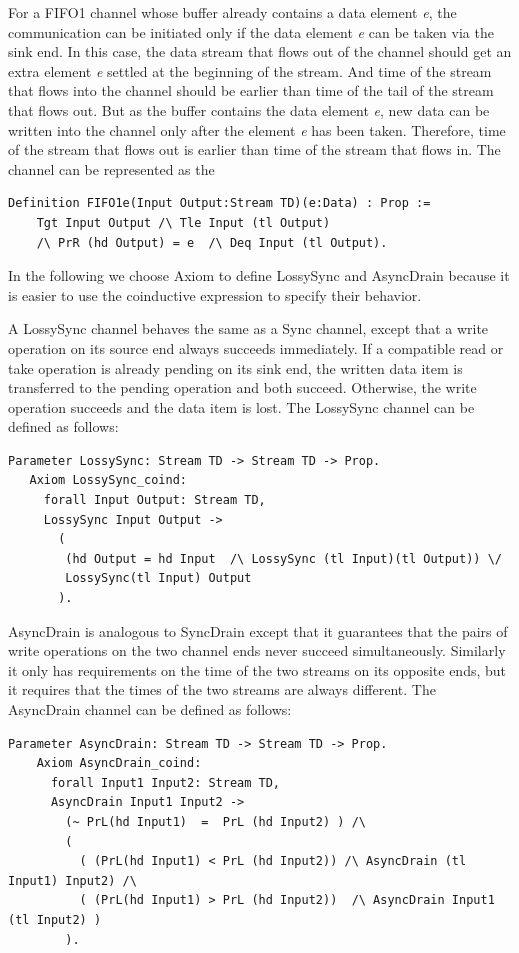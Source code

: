 \documentclass[preprint,3p]{elsarticle}
\begin{document}
For a FIFO1 channel whose buffer already contains a data element \emph{e}, the communication can be initiated only if the data element \emph{e} can be taken via the sink end. In this case, the data stream that flows out of the channel should get an extra element \emph{e} settled at the beginning of the stream. And time of the stream that flows into the channel should be earlier than time of the tail of the stream that flows out. But as the buffer contains the data element \emph{e}, new data can be written into the channel only after the element \emph{e} has been taken. Therefore, time of the stream that flows out is earlier than time of the stream that flows in. The channel can be represented as the \begin{lstlisting}[language=coq]
    Definition FIFO1e(Input Output:Stream TD)(e:Data) : Prop :=
    Tgt Input Output /\ Tle Input (tl Output)
    /\ PrR (hd Output) = e  /\ Deq Input (tl Output).
\end{lstlisting}

In the following we choose Axiom to define LossySync and AsyncDrain
because it is easier to use the coinductive expression to specify
their behavior.

A LossySync channel behaves the same as a Sync channel, except that a write operation on its source end always succeeds immediately. If a compatible read or take operation is already pending on its sink end, the written data item is transferred to the pending operation and both succeed. Otherwise, the write operation succeeds and the data item is lost. The LossySync channel can be defined as follows:
\begin{lstlisting}[language=coq]
   Parameter LossySync: Stream TD -> Stream TD -> Prop.
   Axiom LossySync_coind:
     forall Input Output: Stream TD,
     LossySync Input Output ->
       (
        (hd Output = hd Input  /\ LossySync (tl Input)(tl Output)) \/
        LossySync(tl Input) Output
       ).
\end{lstlisting}

AsyncDrain is analogous to SyncDrain except that it guarantees that the pairs of write operations on the two channel ends never succeed simultaneously. Similarly it only has requirements on the time of the two streams on its opposite ends, but it requires that the times of the two streams are always different. The AsyncDrain channel can be defined as follows:
\begin{lstlisting}[language=coq]
    Parameter AsyncDrain: Stream TD -> Stream TD -> Prop.
    Axiom AsyncDrain_coind:
      forall Input1 Input2: Stream TD,
      AsyncDrain Input1 Input2 ->
        (~ PrL(hd Input1)  =  PrL (hd Input2) ) /\
        (
          ( (PrL(hd Input1) < PrL (hd Input2)) /\ AsyncDrain (tl Input1) Input2) /\
          ( (PrL(hd Input1) > PrL (hd Input2))  /\ AsyncDrain Input1 (tl Input2) )
        ).
\end{lstlisting}
\end{document}
